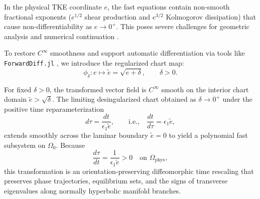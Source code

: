 In the physical TKE coordinate $e$, the fast equations contain non-smooth fractional exponents ($e^{1/2}$ shear production and $e^{3/2}$ Kolmogorov dissipation) that cause non-differentiability as $e \to 0^+$. This poses severe challenges for geometric analysis and numerical continuation \citep{desroches2012canards, Steinebach2023Rodas5P}.

To restore $C^\infty$ smoothness and support automatic differentiation via tools like \texttt{ForwardDiff.jl} \citep{Rackauckas2017DifferentialEquations}, we introduce the regularized chart map:
\begin{equation}
\phi_\delta : e \mapsto \tilde e = \sqrt{e + \delta}, \qquad \delta > 0.
\end{equation}

\begin{proposition}
For fixed $\delta > 0$, the transformed vector field is $C^\infty$ smooth on the interior chart domain $\tilde e > \sqrt{\delta}$. The limiting desingularized chart obtained as $\delta \to 0^+$ under the positive time reparameterization
\begin{equation}
d\tau = \frac{dt}{\epsilon_1 \tilde e}, \qquad \text{i.e.,} \quad \frac{dt}{d\tau} = \epsilon_1 \tilde e,
\end{equation}
extends smoothly across the laminar boundary $\tilde e = 0$ to yield a polynomial fast subsystem on $\Omega_0$. Because
\begin{equation}
\frac{d\tau}{dt} = \frac{1}{\epsilon_1 \tilde e} > 0 \quad \text{on } \Omega_{\mathrm{phys}},
\end{equation}
this transformation is an orientation-preserving diffeomorphic time rescaling that preserves phase trajectories, equilibrium sets, and the signs of transverse eigenvalues along normally hyperbolic manifold branches.
\end{proposition}

